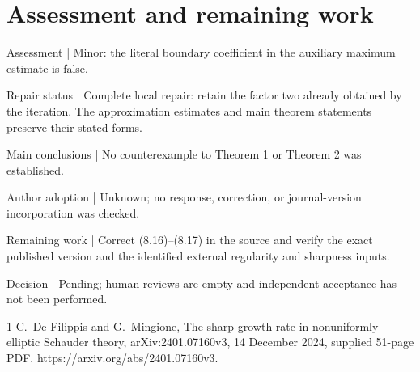 \documentclass[10pt]{article}
\begin{document}
\section*{Assessment and remaining work}
Assessment | Minor: the literal boundary coefficient in the auxiliary maximum estimate is false.\par
Repair status | Complete local repair: retain the factor two already obtained by the iteration. The approximation estimates and main theorem statements preserve their stated forms.\par
Main conclusions | No counterexample to Theorem 1 or Theorem 2 was established.\par
Author adoption | Unknown; no response, correction, or journal-version incorporation was checked.\par
Remaining work | Correct (8.16)–(8.17) in the source and verify the exact published version and the identified external regularity and sharpness inputs.\par
Decision | Pending; human reviews are empty and independent acceptance has not been performed.\par
1 C. De Filippis and G. Mingione, The sharp growth rate in nonuniformly elliptic Schauder theory, arXiv:2401.07160v3, 14 December 2024, supplied 51-page PDF. https://arxiv.org/abs/2401.07160v3.\par
\end{document}

